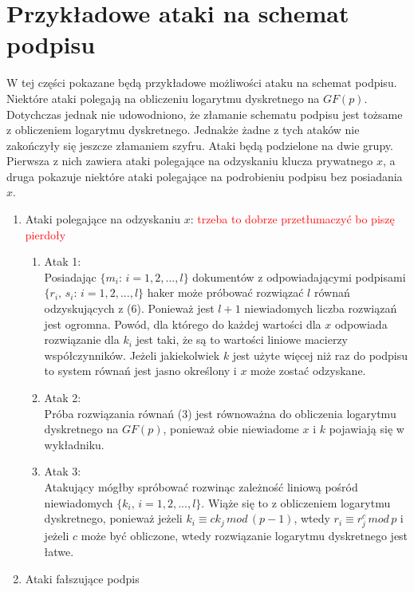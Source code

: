 \documentclass[12pt,a4paper]{article}
\newcommand\todo[1]{\textcolor{red}{#1}}
\begin{document}
\section{Przykładowe ataki na schemat podpisu}
W tej części pokazane będą przykładowe możliwości ataku na schemat podpisu. Niektóre ataki polegają na obliczeniu logarytmu dyskretnego na $GF(p)$. Dotychczas jednak nie udowodniono, że złamanie schematu podpisu jest tożsame z obliczeniem logarytmu dyskretnego. Jednakże żadne z tych ataków nie zakończyły się jeszcze złamaniem szyfru. Ataki będą podzielone na dwie grupy. Pierwsza z nich zawiera ataki polegające na odzyskaniu klucza prywatnego $x$, a druga pokazuje niektóre ataki polegające na podrobieniu podpisu bez posiadania $x$.
\begin{enumerate}

    \item Ataki polegające na odzyskaniu $x$:
    \todo{trzeba to dobrze przetłumaczyć bo piszę pierdoły}
    \begin{enumerate}
        \item Atak 1:\\
        Posiadając $\{ m_{i}:\,i=1,2,...,l\}$ dokumentów z odpowiadającymi podpisami $\{r_{i},\,s_{i}:\,i=1,2,...,l\}$ haker może próbować rozwiązać $l$ równań odzyskujących z (6). Ponieważ jest $l+1$ niewiadomych liczba rozwiązań jest ogromna. Powód, dla którego do każdej wartości dla $x$ odpowiada rozwiązanie dla $k_{i}$ jest taki, że są to wartości liniowe macierzy współczynników.
        Jeżeli jakiekolwiek $k$ jest użyte więcej niż raz do podpisu to system równań jest jasno określony i $x$ może zostać odzyskane. 
        \item Atak 2:\\
        Próba rozwiązania równań (3) jest równoważna do obliczenia logarytmu dyskretnego na $GF(p)$, ponieważ obie niewiadome $x$ i $k$ pojawiają się w wykładniku.
        \item Atak 3:\\
        Atakujący mógłby spróbować rozwinąc zależność liniową pośród niewiadomych $\{ k_{i},\,i=1,2,...,l\}$. Wiąże się to z obliczeniem logarytmu dyskretnego, ponieważ jeżeli $k_{i}\equiv ck_{j}\,mod\,(p-1)$, wtedy $r_{i}\equiv r_{j}^{c}\,mod\,p$ i jeżeli $c$ może być obliczone, wtedy rozwiązanie logarytmu dyskretnego jest łatwe.
    \end{enumerate}
    \item Ataki fałszujące podpis
    \begin{enumerate}

\end{enumerate}
\end{enumerate}
\end{document}
